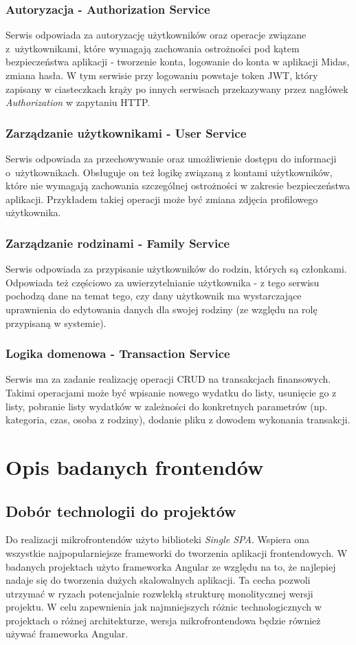 \documentclass{SGGW-thesis}
\begin{document}
\subsection{Autoryzacja - Authorization Service}
Serwis odpowiada za autoryzację użytkowników oraz operacje związane z~użytkownikami, które wymagają zachowania ostrożności pod kątem bezpieczeństwa aplikacji - tworzenie konta, logowanie do konta w aplikacji Midas, zmiana hasła. W tym serwisie przy logowaniu powstaje token JWT, który zapisany w ciasteczkach krąży po innych serwisach przekazywany przez nagłówek \textit{Authorization} w zapytaniu HTTP.

\subsection{Zarządzanie użytkownikami - User Service}
Serwis odpowiada za przechowywanie oraz umożliwienie dostępu do informacji o~użytkownikach. Obsługuje on też logikę związaną z kontami użytkowników, które nie wymagają zachowania szczególnej ostrożności w zakresie bezpieczeństwa aplikacji. Przykładem takiej operacji może być zmiana zdjęcia profilowego użytkownika.

\subsection{Zarządzanie rodzinami - Family Service}
Serwis odpowiada za przypisanie użytkowników do rodzin, których są członkami. Odpowiada też częściowo za uwierzytelnianie użytkownika - z tego serwisu pochodzą dane na temat tego, czy dany użytkownik ma wystarczające uprawnienia do edytowania danych dla swojej rodziny (ze względu na rolę przypisaną w systemie).

\subsection{Logika domenowa - Transaction Service}
Serwis ma za zadanie realizację operacji CRUD na transakcjach finansowych. Takimi operacjami może być wpisanie nowego wydatku do listy, usunięcie go z listy, pobranie listy wydatków w zależności do konkretnych parametrów (np. kategoria, czas, osoba z rodziny), dodanie pliku z dowodem wykonania transakcji.

\chapter{Opis badanych frontendów}
\section{Dobór technologii do projektów}
Do realizacji mikrofrontendów użyto biblioteki \textit{Single SPA}. Wspiera ona wszystkie najpopularniejsze frameworki do tworzenia aplikacji frontendowych. W badanych projektach użyto frameworka Angular ze względu na to, że najlepiej nadaje się do tworzenia dużych skalowalnych aplikacji. Ta cecha pozwoli utrzymać w ryzach potencjalnie rozwlekłą strukturę monolitycznej wersji projektu. W celu zapewnienia jak najmniejszych różnic technologicznych w projektach o różnej architekturze, wersja mikrofrontendowa będzie również używać frameworka Angular.
\end{document}
